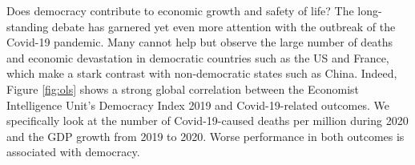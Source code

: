 
Does democracy contribute to economic growth and safety of life? %
The long-standing debate has garnered yet even more attention with the outbreak of the Covid-19 pandemic. Many cannot help but observe the large number of deaths and economic devastation in democratic countries such as the US and France, which make a stark contrast with non-democratic states such as China. %
Indeed, Figure \ref{fig:ols} shows a strong global correlation between the Economist Intelligence Unit’s Democracy Index 2019 and Covid-19-related outcomes. We specifically look at the number of Covid-19-caused deaths per million during 2020 and the GDP growth from 2019 to 2020. 
Worse performance in both outcomes is associated with democracy. 


    
